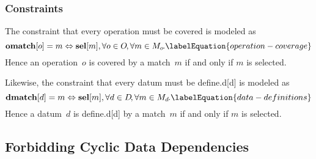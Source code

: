 \subsubsection{Constraints}

The \gls{constraint} that every \gls{operation} must be covered is modeled as
%
\begin{equation}
  \mVar{omatch}[o] = m \mEq \mVar{sel}[m],
  \forall o \in \mOpSet \hspace{-1pt},
  \forall m \in \mMatchSet[o] \hspace{-1pt}.
  \labelEquation{operation-coverage}
\end{equation}
%
Hence an \gls{operation}~$o$ is covered by a match~$m$ if and only if $m$ is
selected.

Likewise, the \gls{constraint} that every \gls{datum} must be \gls{define.d}[d]
is modeled as
%
\begin{equation}
  \mVar{dmatch}[d] = m \mEq \mVar{sel}[m],
  \forall d \in \mDataSet \hspace{-1.5pt},
  \forall m \in \mMatchSet[d] \hspace{-1pt}.
  \labelEquation{data-definitions}
\end{equation}
%
Hence a \gls{datum}~$d$ is \gls{define.d}[d] by a match~$m$ if and only if $m$
is selected.


\subsection{Forbidding Cyclic Data Dependencies}

